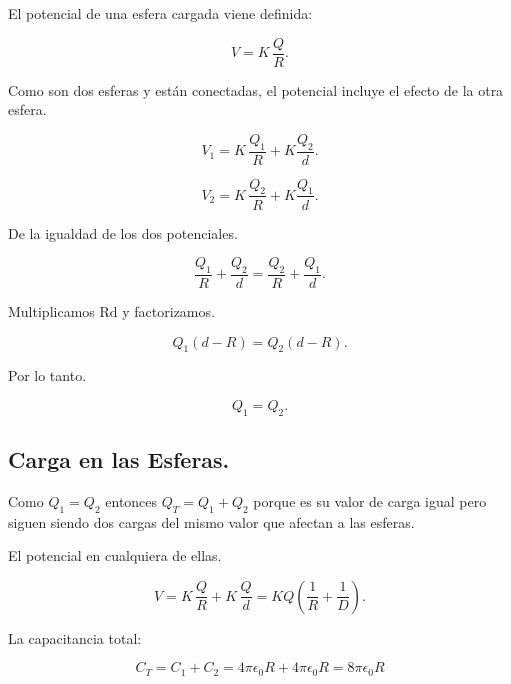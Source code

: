 \documentclass[a4paper,12pt]{article} %
\begin{document}
\begin{justify}
	El potencial de una esfera cargada viene definida:
\end{justify}

\[ V = K \, \frac{Q}{R}. \]

\begin{justify}
	Como son dos esferas y están conectadas, el potencial incluye el efecto de la otra esfera.
\end{justify}

\[ V_1 = K \, \frac{Q_1}{R} + K \frac{Q_2}{d}. \]

\[ V_2 = K \, \frac{Q_2}{R} + K \frac{Q_1}{d}. \]

\begin{justify}
	De la igualdad de los dos potenciales.
\end{justify}

\[ \frac{Q_1}{R} + \frac{Q_2}{d} =  \frac{Q_2}{R} + \frac{Q_1}{d}. \]

\begin{justify}
	Multiplicamos \(\mathrm{Rd}\) y factorizamos.
\end{justify}

\[ Q_1 \left( d - R \right) = Q_2 \left( d - R \right). \]

\begin{justify}
	Por lo tanto.
\end{justify}

\[ Q_1 = Q_2. \]


\subsection{Carga en las Esferas.}

\begin{justify}
	Como \(Q_1 = Q_2\) entonces \(Q_T = Q_1 + Q_2\) porque es su valor de carga igual pero siguen siendo dos cargas del mismo valor que afectan a las esferas.
\end{justify}

\begin{justify}
	El potencial en cualquiera de ellas.
\end{justify}

\[ V = K \, \frac{Q}{R} + K \, \frac{Q}{d} = KQ \left(\frac{1}{R} + \frac{1}{D}\right). \]

\begin{justify}
	La capacitancia total:
\end{justify}

\[ C_T = C_1 + C_2 = 4 \pi \epsilon_0 R + 4 \pi \epsilon_0 R = 8 \pi \epsilon_0 R  \]
\end{document}

